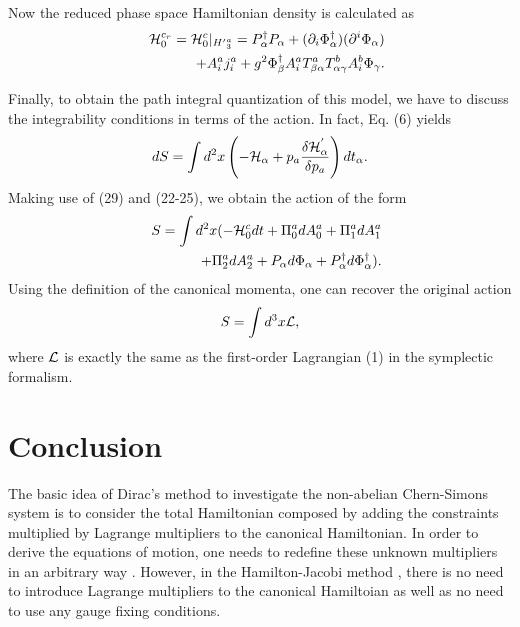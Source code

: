 \documentclass[a4paper,12pt]{article}
\begin{document}
Now the reduced phase space Hamiltonian density is calculated as
\begin{eqnarray}
&&{\cal H}_{0}^{{c}_{r}}= {\cal H}_{0}^{c}|_ {{H'}_{3}^{a}}=
P_{\alpha}^{\dag}P_{\alpha}+
(\partial_{i}\Phi_{\alpha}^{\dag})(\partial^{i}\Phi_{\alpha})\nonumber\\&&\;\;\;\;\;+
A_{i}^{a}j_{i}^{a} +
g^{2}\Phi_{\beta}^{\dag}A_{i}^{a}T_{\beta\alpha}^{a}T_{\alpha\gamma}^{b}A_{i}^{b}\Phi_{\gamma}.
\end{eqnarray}

 Finally, to obtain the path integral quantization \cite{sm3} of this
model, we have to discuss the integrability conditions in terms
of the action. In fact, Eq. (6) yields
\begin{equation}
dS= \int d^{2}x\left(-{\cal H}_{\alpha}+ p_a \frac{\delta {\cal
H}^{'}_{\alpha}}{\delta p_a}\right)dt_{\alpha}.
\end{equation}
Making use of (29) and (22-25), we obtain the action of the form
\begin{eqnarray}
&&S=\int d^{2}x (- {\cal H}_{0}^{c} dt + \Pi_{0}^{a} dA_{0}^{a} +
\Pi_{1}^{a}dA_{1}^{a}\nonumber\\&& \;\;\;\;\;\;\;\;\;\; +
\Pi_{2}^{a}dA_{2}^{a}+ P_{\alpha}d\Phi_{\alpha} +
P_{\alpha}^{\dag} d\Phi_{\alpha}^{\dag}).
\end{eqnarray}
Using the definition of the canonical momenta, one can recover
the original action
\begin{equation} S=\int d^{3}x {\cal L},
\end{equation}
where ${\cal L}$ is exactly the same as the first-order
Lagrangian (1) in the symplectic formalism.

\section{ Conclusion}
The basic idea of Dirac's method \cite{di} to investigate the
non-abelian Chern-Simons system is to consider the total
Hamiltonian composed by adding the constraints multiplied by
Lagrange multipliers to the canonical Hamiltonian. In order to
derive the equations of motion, one needs to redefine these
unknown multipliers in an arbitrary way \cite{fer,des,shar}.
However, in the Hamilton-Jacobi method \cite{sm2,gl}, there is no
need to introduce Lagrange multipliers to the canonical
Hamiltoian as well as no need to use any gauge fixing conditions.
\end{document}
